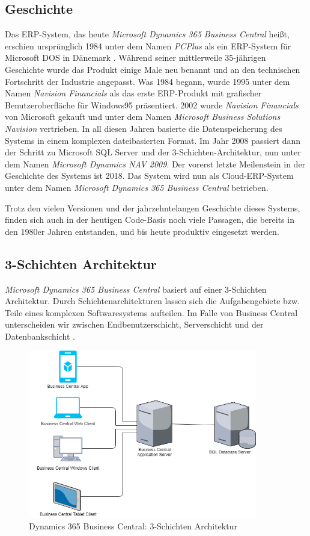 \subsection{Geschichte}
\label{subsec:Geschichte}
Das ERP-System, das heute \textit{Microsoft Dynamics 365 Business Central} heißt, erschien ursprünglich 1984 unter dem Namen \textit{PCPlus} als ein ERP-System für Microsoft DOS in Dänemark \cite{DesignAndImplementationGayer}. Während seiner mittlerweile 35-jährigen Geschichte wurde das Produkt einige Male neu benannt und an den technischen Fortschritt der Industrie angepasst. Was 1984 begann, wurde 1995 unter dem Namen \textit{Navision Financials} als das erste ERP-Produkt mit grafischer Benutzeroberfläche für Windows95 präsentiert. 2002 wurde \textit{Navision Financials} von Microsoft gekauft und unter dem Namen \textit{Microsoft Business Solutions Navision} vertrieben. In all diesen Jahren basierte die Datenspeicherung des Systems in einem komplexen dateibasierten Format. Im Jahr 2008 passiert dann der Schritt zu Microsoft SQL Server und der 3-Schichten-Architektur, nun unter dem Namen \textit{Microsoft Dynamics NAV 2009}. Der vorerst letzte Meilenstein in der Geschichte des Systems ist 2018. Das System wird nun als Cloud-ERP-System unter dem Namen \textit{Microsoft Dynamics 365 Business Central} betrieben.

Trotz den vielen Versionen und der jahrzehntelangen Geschichte dieses Systems, finden sich auch in der heutigen Code-Basis noch viele Passagen, die bereits in den 1980er Jahren entstanden, und bis heute produktiv eingesetzt werden.

\subsection{3-Schichten Architektur}
\label{subsec:3-Schichten Architektur}
\textit{Microsoft Dynamics 365 Business Central} basiert auf einer 3-Schichten Architektur. Durch Schichtenarchitekturen lassen sich die Aufgabengebiete bzw. Teile eines komplexen Softwaresystems aufteilen. Im Falle von Business Central unterscheiden wir zwischen Endbenutzerschicht, Serverschicht und der Datenbankschicht \cite{msdnProductArchitecture}\cite{DesignAndImplementationGayer}.

\begin{figure}[h]
	\centering
	\includegraphics[width=100mm]{images/3TierArchitecture.png}
	\caption{Dynamics 365 Business Central: 3-Schichten Architektur}
	\label{fig:Image3TierArchitecture}
\end{figure}

